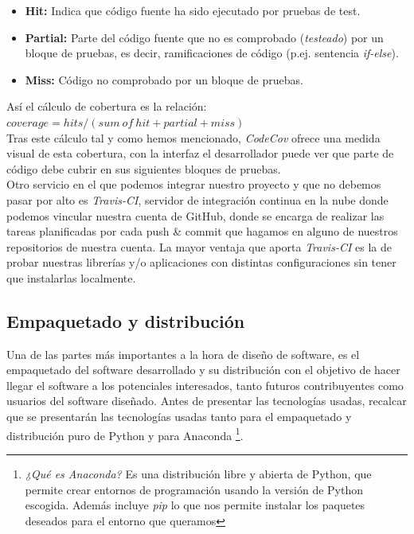 \begin{itemize}
    \item \textbf{Hit: } Indica que código fuente ha sido ejecutado por pruebas de test.
    \item \textbf{Partial: } Parte del código fuente que no es comprobado (\emph{testeado}) por un bloque de pruebas, es decir, ramificaciones de código (p.ej. sentencia \emph{if-else}).
    \item \textbf{Miss: } Código no comprobado por un bloque de pruebas.
\end{itemize}
Así el cálculo de cobertura es la relación: $coverage = hits / (sum\ of\ hit + partial + miss)$ \\
Tras este cálculo tal y como hemos mencionado, \emph{CodeCov} ofrece una medida visual de esta cobertura, con la interfaz el desarrollador puede ver que parte de código debe cubrir en sus siguientes bloques de pruebas. \\
Otro servicio en el que podemos integrar nuestro proyecto y que no debemos pasar por alto es \emph{Travis-CI}, servidor de integración continua en la nube donde podemos vincular nuestra cuenta de GitHub, donde se encarga de realizar las tareas planificadas por cada push \& commit que hagamos en alguno de nuestros repositorios de nuestra cuenta. La mayor ventaja que aporta \emph{Travis-CI} es la de probar nuestras librerías y/o aplicaciones con distintas configuraciones sin tener que instalarlas localmente.

 \subsection{Empaquetado y distribución}
 Una de las partes más importantes a la hora de diseño de software, es el empaquetado del software desarrollado y su distribución con el objetivo de hacer llegar el software a los potenciales interesados, tanto futuros contribuyentes como usuarios del software diseñado. Antes de presentar las tecnologías usadas, recalcar que se presentarán las tecnologías usadas tanto para el empaquetado y distribución puro de Python y para Anaconda \footnote{\textit{¿Qué es Anaconda?} Es una distribución libre y abierta de Python, que permite crear entornos de programación usando la versión de Python escogida. Además incluye \emph{pip} lo que nos permite instalar los paquetes deseados para el entorno que queramos}. \\
 
